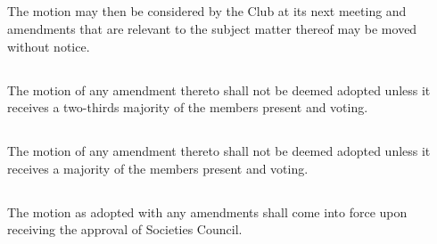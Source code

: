 \documentclass[10.5pt]{article}
\begin{document}
\subsection{} The motion may then be considered by the Club at its next meeting and amendments that are relevant to the subject matter thereof may be moved without notice.
\subsection{}The motion of any amendment thereto shall not be deemed adopted unless it receives a two-thirds majority of the members present and voting. 
\subsection{} The motion of any amendment thereto shall not be deemed adopted unless it receives a majority of the members present and voting. 
\subsection{} The motion as adopted with any amendments shall come into force upon receiving the approval of Societies Council.
\end{document}
